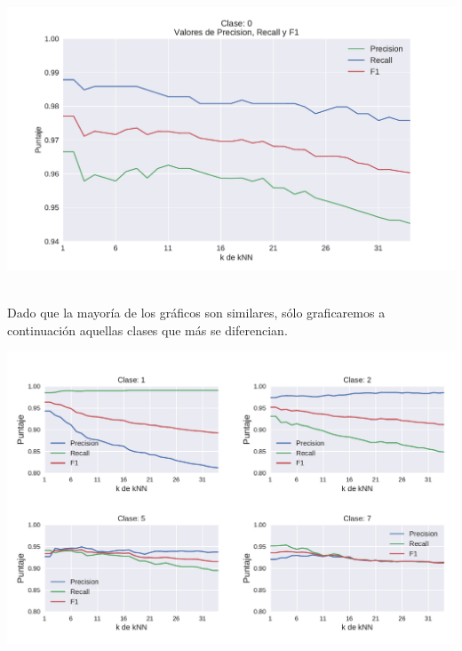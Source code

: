 {\centering
    \includegraphics[scale=0.55]{informe/imagenes/knn/precisionClase0REENTREGA.pdf} \\
}
$ $\newline

Dado que la mayoría de los gráficos son similares, sólo graficaremos a continuación aquellas clases que más se diferencian.

{\centering
    \includegraphics[scale=0.70]{informe/imagenes/knn/precisionClase1257.pdf} \\
    \label{fig:knnclasesvariacion}
}
$ $\newline

